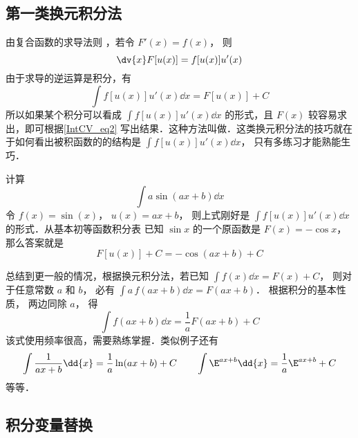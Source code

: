 
\subsection{第一类换元积分法}
由复合函数的求导法则
，若令 $F'(x) = f(x)$， 则
\begin{equation}
\dv{x}	F[u(x)] = f[u(x)]u'(x)
\end{equation}
由于求导的逆运算是积分，有
\begin{equation}\label{IntCV_eq2}
\int f[u(x)]u'(x) \dd{x}  = F[u(x)] + C
\end{equation}
所以如果某个积分可以看成 $\int f[u(x)]u'(x) \dd{x}$ 的形式，且 $F(x)$ 较容易求出，即可根据\autoref{IntCV_eq2} 写出结果．这种方法叫做．这类换元积分法的技巧就在于如何看出被积函数的的结构是 $\int f[u(x)]u'(x) \dd{x}$， 只有多练习才能熟能生巧． 

\begin{exam}{}
计算
\begin{equation}
\int a\sin(ax + b) \dd{x}
\end{equation}
令 $f(x) = \sin(x)$， $u(x) = ax + b$， 则上式刚好是 $\int f[u(x)]u'(x) \dd{x}$ 的形式．从基本初等函数积分表 %
已知 $\sin x$ 的一个原函数是 $F(x) = -\cos x$， 那么答案就是
\begin{equation}
F[u(x)] + C =  - \cos(ax + b) + C
\end{equation}
\end{exam}

总结到更一般的情况，根据换元积分法，若已知 $\int f(x) \dd{x}  = F(x) + C$， 则对于任意常数 $a$ 和 $b$， 必有 $\int a \,f(ax + b) \dd{x} = F(ax + b)$． 根据积分的基本性质，%
两边同除 $a$， 得
\begin{equation}\label{IntCV_eq5}
\int f(ax + b) \dd{x} = \frac{1}{a} F(ax + b) + C
\end{equation}
该式使用频率很高，需要熟练掌握．类似例子还有
\begin{equation}
\int \frac{1}{ax+b} \dd{x} = \frac{1}{a}\ln (ax + b)+C  \qquad
\int \E^{ax + b} \dd{x} = \frac{1}{a} \E^{ax + b}+C
\end{equation}
等等．

\subsection{积分变量替换}

